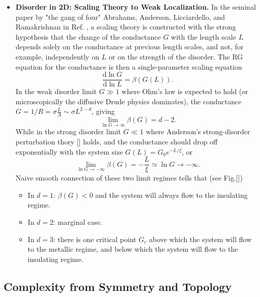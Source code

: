 \begin{itemize}
            \item \textbf{Disorder in 2D: Scaling Theory to Weak Localization.} In the seminal paper by "the gang of four" Abrahams, Anderson, Licciardello, and Ramakrishnan in Ref. \cite{abrahams1979scaling}, a scaling theory is constructed with the strong hypothesis that the change of the conductance $G$ with the length scale $L$ depends solely on the conductance at previous length scales, and not, for example, independently on $L$ or on the strength of the disorder. The RG equation for the conductance is then a single-parameter scaling equation
            \begin{equation*}
                \dfrac{\mathrm d\ln G}{\mathrm d\ln L}=\beta(G(L)).
            \end{equation*}
            In the weak disorder limit $G\gg1$ where Ohm's law is expected to hold (or microscopically the diffusive Drude physics dominates), the conductance $G=1/R=\sigma\frac{L}{A}\sim\sigma L^{2-d}$, giving
            \begin{equation*}
                \lim_{\ln G\rightarrow\infty}\beta(G)=d-2.
            \end{equation*}
            While in the strong disorder limit $G\ll1$ where Anderson's strong-disorder perturbation thory [] holds, and the conductance should drop off exponentially with the system size $G(L)=G_0 e^{-L/\xi}$, or
            \begin{equation*}
                \lim_{\ln G\rightarrow-\infty}\beta(G)=-\frac{L}{\xi}\simeq\ln G\rightarrow-\infty.
            \end{equation*}
            Naive smooth connection of these two limit regimes tells that (see Fig.[])
            \begin{itemize}
                \item In $d=1$: $\beta(G)<0$ and the system will always flow to the insulating regime.
                \item In $d=2$: marginal case.
                \item In $d=3$: there is one critical point $G_c$ above which the system will flow to the metallic regime, and below which the system will flow to the insulating regime.
            \end{itemize}
        \end{itemize}

    \subsection{Complexity from Symmetry and Topology}
